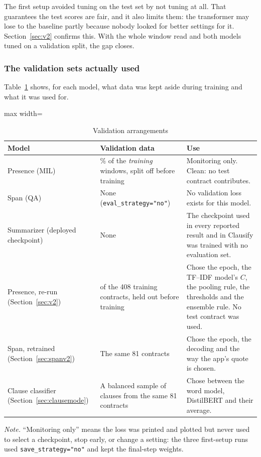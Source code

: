 The first setup avoided tuning on the test set by not tuning at all. That guarantees the test scores are fair, and it also limits them: the transformer may lose to the baseline partly because nobody looked for better settings for it. Section~\ref{sec:v2} confirms this. With the whole window read and both models tuned on a validation split, the gap closes.

\subsubsection{The validation sets actually used}
Table~\ref{tab:valsets} shows, for each model, what data was kept aside during training and what it was used for.

\begin{table}[ht]
\centering
\caption{Validation arrangements}
\label{tab:valsets}
\small
\begin{adjustbox}{max width=\textwidth}
\begin{tabular}{>{\raggedright\arraybackslash}p{2.6cm} >{\raggedright\arraybackslash}p{4.5cm} >{\raggedright\arraybackslash}p{6.2cm}}
\toprule
\textbf{Model} & \textbf{Validation data} & \textbf{Use}\\
\midrule
Presence (MIL) & 5\% of the \emph{training} windows, split off before training & Monitoring only. Clean: no test contract contributes.\\
\addlinespace
Span (QA) & None (\texttt{eval\_strategy="no"}) & No validation loss exists for this model.\\
\addlinespace
Summarizer (deployed checkpoint) & None & The checkpoint used in every reported result and in Clausify was trained with no evaluation set.\\
\addlinespace
Presence, re-run (Section~\ref{sec:v2}) & 81 of the 408 training contracts, held out before training & Chose the epoch, the TF--IDF model's $C$, the pooling rule, the thresholds and the ensemble rule. No test contract was used.\\
\addlinespace
Span, retrained (Section~\ref{sec:spanv2}) & The same 81 contracts & Chose the epoch, the decoding and the way the app's quote is chosen.\\
\addlinespace
Clause classifier (Section~\ref{sec:clausemode}) & A balanced sample of clauses from the same 81 contracts & Chose between the word model, DistilBERT and their average.\\
\bottomrule
\end{tabular}
\end{adjustbox}

{\footnotesize\singlespacing \emph{Note.} ``Monitoring only'' means the loss was printed and plotted but never used to select a checkpoint, stop early, or change a setting: the three first-setup runs used \texttt{save\_strategy="no"} and kept the final-step weights.\par}
\end{table}

